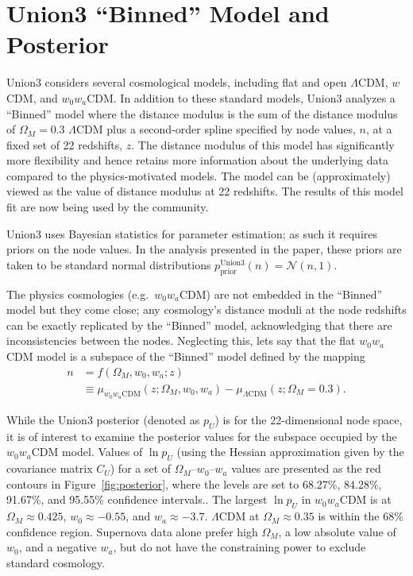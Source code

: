 \documentclass[11pt,a4paper]{article}
\begin{document}
\section{Union3 ``Binned'' Model and Posterior}
\label{sec:union3}
Union3 considers several cosmological models, including  flat and open $\Lambda$CDM, $w$CDM, and $w_0w_a$CDM.
In addition to these standard models,  Union3 analyzes a ``Binned'' model where the  distance modulus
is the sum of the distance modulus of $\Omega_M=0.3$  $\Lambda$CDM plus a second-order spline specified by node values, $n$,
at a fixed set of 22 redshifts, $z$.  The distance modulus of this model has significantly more flexibility 
and hence retains more information about the underlying data compared to the physics-motivated models.
The model can be (approximately) viewed as the value of distance modulus at 22 redshifts.
The results of this model fit are now being used by the community.

Union3 uses Bayesian statistics for parameter estimation; as such it requires 
priors on the node values. In the analysis presented in the paper, these priors are taken to be standard normal distributions
$p^\text{Union3}_\text{prior}(n)=  \mathcal{N}(n,1)$.

The physics cosmologies (e.g.\ $w_0w_a$CDM)  are not embedded in the ``Binned'' model but 
they come close; any cosmology's distance moduli at the node redshifts can be exactly replicated by the ``Binned'' model, acknowledging that
there are
inconsistencies between the nodes.  Neglecting this, lets say that the flat $w_0w_a$CDM model
is a subspace of the ``Binned'' model defined by the mapping
\begin{align}
	n &= f(\Omega_M, w_0, w_a; z) \\
	& \equiv \mu_{w_0 w_a \text{CDM}}(z;\Omega_M, w_0, w_a)  - \mu_{\Lambda \text{CDM}}(z;\Omega_M=0.3).
\end{align}

While the Union3 posterior (denoted as $p_U$) is for the 22-dimensional node space, it is of interest to examine the posterior values for the
subspace occupied by the $w_0w_a$CDM
model. 
Values of $\ln{p_U}$ (using the Hessian approximation given by the covariance matrix $C_U$) for a
set of $\Omega_M$--$w_0$--$w_a$ values
 are presented as the red contours in Figure~\ref{fig:posterior}, where the levels are set to 68.27\%, 84.28\%, 91.67\%, and 95.55\% confidence intervals..
The largest $\ln{p_U}$ in $w_0w_a$CDM is at $\Omega_M\approx 0.425$, $w_0 \approx -0.55$, and $w_a \approx -3.7$. $\Lambda$CDM at $\Omega_M \approx 0.35$ is within the 68\% confidence region.
Supernova data alone prefer high $\Omega_M$, a low absolute value of $w_0$, and a negative $w_a$, but do not have
the constraining power to exclude standard cosmology.
\end{document}

